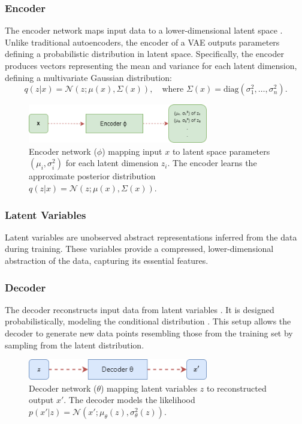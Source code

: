 \subsubsection{Encoder}
The encoder network maps input data  to a lower-dimensional latent space . Unlike traditional autoencoders, the encoder of a VAE outputs parameters defining a probabilistic distribution in latent space. Specifically, the encoder produces vectors representing the mean  and variance  for each latent dimension, defining a multivariate Gaussian distribution:
\begin{equation}
q(z|x) = \mathcal{N}(z; \mu(x), \Sigma(x)), \quad \text{where } \Sigma(x) = \text{diag}(\sigma_1^2, \dots, \sigma_n^2).
\end{equation}
\begin{figure}[htbp]
    \centering
    \includegraphics[width=0.7\textwidth]{img/vae/Image To Encoder To Latent Variable Parameters.png}
    \caption[Encoder network mapping input to latent parameters]{Encoder network ($\phi$) mapping input $x$ to latent space parameters $(\mu_i, \sigma_i^2)$ for each latent dimension $z_i$. The encoder learns the approximate posterior distribution $q(z|x) = \mathcal{N}(z; \mu(x), \Sigma(x))$.}
    \label{fig:encoder}
\end{figure}

\subsubsection{Latent Variables}
Latent variables  are unobserved abstract representations inferred from the data during training. These variables provide a compressed, lower-dimensional abstraction of the data, capturing its essential features.

\subsubsection{Decoder}
The decoder reconstructs input data  from latent variables . It is designed probabilistically, modeling the conditional distribution . This setup allows the decoder to generate new data points resembling those from the training set by sampling from the latent distribution.
\begin{figure}[htbp]
    \centering
    \includegraphics[width=0.7\textwidth]{img/vae/decoder_figure.png}
    \caption[Decoder network reconstructing outputs from latent space]{Decoder network ($\theta$) mapping latent variables $z$ to reconstructed output $x'$. The decoder models the likelihood $p(x'|z) = \mathcal{N}(x'; \mu_\theta(z), \sigma_\theta^2(z))$.}
    \label{fig:decoder}
\end{figure}


